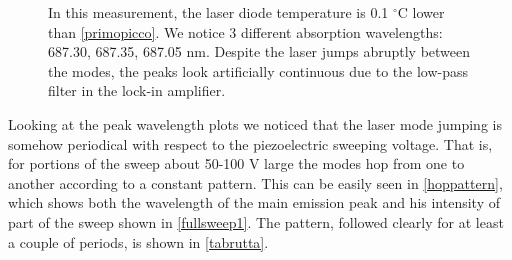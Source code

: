 \begin{figure}[!hptb]\centering
{} 
\caption{In this measurement, the laser diode temperature is 0.1 $^\circ$C lower than \cref{primopicco}. We notice 3 different absorption wavelengths: 687.30, 687.35, 687.05 nm. Despite the laser jumps abruptly between the modes, the peaks look artificially continuous due to the low-pass filter in the lock-in amplifier.}\label{moltipicchi}
\end{figure} 

\medskip
Looking at the peak wavelength plots we noticed that the laser mode jumping is somehow periodical with respect to the piezoelectric sweeping voltage. That is, for portions of the sweep about 50-100 V large the modes hop from one to another according to a constant pattern.
This can be easily seen in \cref{hoppattern}, which shows both the wavelength of the main emission peak and his intensity of part of the sweep shown in \cref{fullsweep1}. The pattern, followed clearly for at least a couple of periods, is shown in \cref{tabrutta}.

